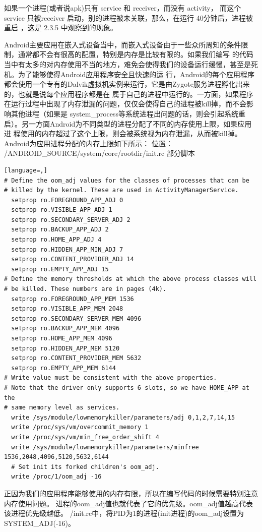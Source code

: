 \documentclass[a4paper, 11pt]{article}
\begin{document}
如果一个进程(或者说apk)只有 service 和 receiver，而没有 activity， 而这个
service 只被receiver 启动，别的进程被未关联，那么，在运行 40分钟后，进程被重启
，这是 2.3.5 中观察到的现象。

Android主要应用在嵌入式设备当中，而嵌入式设备由于一些众所周知的条件限制，通常都不会有很高的配置，特别是内存是比较有限的。如果我们编写 的代码当中有太多的对内存使用不当的地方，难免会使得我们的设备运行缓慢，甚至是死机。为了能够使得Android应用程序安全且快速的运 行，Android的每个应用程序都会使用一个专有的Dalvik虚拟机实例来运行，它是由Zygote服务进程孵化出来的，也就是说每个应用程序都是在 属于自己的进程中运行的。一方面，如果程序在运行过程中出现了内存泄漏的问题，仅仅会使得自己的进程被kill掉，而不会影响其他进程（如果是 system_process等系统进程出问题的话，则会引起系统重启）。另一方面Android为不同类型的进程分配了不同的内存使用上限，如果应用进 程使用的内存超过了这个上限，则会被系统视为内存泄漏，从而被kill掉。Android为应用进程分配的内存上限如下所示：
位置： /ANDROID_SOURCE/system/core/rootdir/init.rc 部分脚本
\begin{lstlisting}[language=,]
# Define the oom_adj values for the classes of processes that can be
# killed by the kernel. These are used in ActivityManagerService.
  setprop ro.FOREGROUND_APP_ADJ 0
  setprop ro.VISIBLE_APP_ADJ 1
  setprop ro.SECONDARY_SERVER_ADJ 2
  setprop ro.BACKUP_APP_ADJ 2
  setprop ro.HOME_APP_ADJ 4
  setprop ro.HIDDEN_APP_MIN_ADJ 7
  setprop ro.CONTENT_PROVIDER_ADJ 14
  setprop ro.EMPTY_APP_ADJ 15
# Define the memory thresholds at which the above process classes will
# be killed. These numbers are in pages (4k).
  setprop ro.FOREGROUND_APP_MEM 1536
  setprop ro.VISIBLE_APP_MEM 2048
  setprop ro.SECONDARY_SERVER_MEM 4096
  setprop ro.BACKUP_APP_MEM 4096
  setprop ro.HOME_APP_MEM 4096
  setprop ro.HIDDEN_APP_MEM 5120
  setprop ro.CONTENT_PROVIDER_MEM 5632
  setprop ro.EMPTY_APP_MEM 6144
# Write value must be consistent with the above properties.
# Note that the driver only supports 6 slots, so we have HOME_APP at the
# same memory level as services.
  write /sys/module/lowmemorykiller/parameters/adj 0,1,2,7,14,15
  write /proc/sys/vm/overcommit_memory 1
  write /proc/sys/vm/min_free_order_shift 4
  write /sys/module/lowmemorykiller/parameters/minfree 1536,2048,4096,5120,5632,6144
  # Set init its forked children's oom_adj.
  write /proc/1/oom_adj -16
\end{lstlisting}
  正因为我们的应用程序能够使用的内存有限，所以在编写代码的时候需要特别注意内存使用问题。
进程的oom_adj值也就代表了它的优先级。oom_adj值越高代表该进程优先级越低。
/init.rc中，将PID为1的进程(init进程)的oom_adj设置为SYSTEM_ADJ(-16)。
\end{document}

